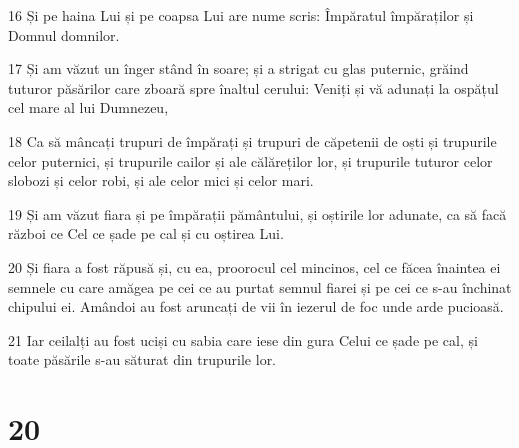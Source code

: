 \par 16 Și pe haina Lui și pe coapsa Lui are nume scris: Împăratul împăraților și Domnul domnilor.
\par 17 Și am văzut un înger stând în soare; și a strigat cu glas puternic, grăind tuturor păsărilor care zboară spre înaltul cerului: Veniți și vă adunați la ospățul cel mare al lui Dumnezeu,
\par 18 Ca să mâncați trupuri de împărați și trupuri de căpetenii de oști și trupurile celor puternici, și trupurile cailor și ale călăreților lor, și trupurile tuturor celor slobozi și celor robi, și ale celor mici și celor mari.
\par 19 Și am văzut fiara și pe împărații pământului, și oștirile lor adunate, ca să facă război ce Cel ce șade pe cal și cu oștirea Lui.
\par 20 Și fiara a fost răpusă și, cu ea, proorocul cel mincinos, cel ce făcea înaintea ei semnele cu care amăgea pe cei ce au purtat semnul fiarei și pe cei ce s-au închinat chipului ei. Amândoi au fost aruncați de vii în iezerul de foc unde arde pucioasă.
\par 21 Iar ceilalți au fost uciși cu sabia care iese din gura Celui ce șade pe cal, și toate păsările s-au săturat din trupurile lor.

\chapter{20}

